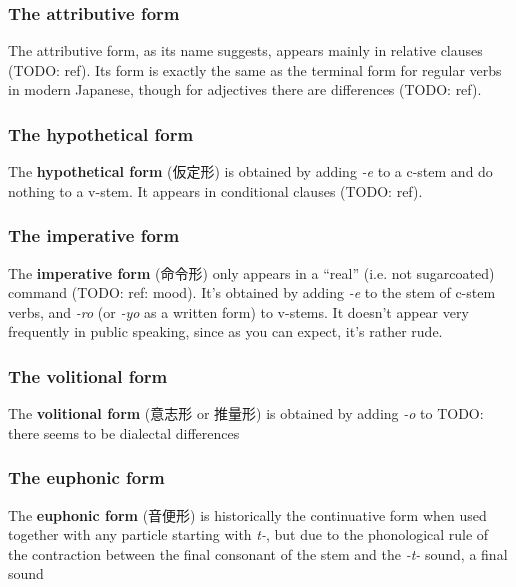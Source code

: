 \documentclass[UTF8, a4paper, oneside, scheme=plain]{ctexrep}
\newcommand*{\concept}[1]{\textbf{#1}}
\newcommand{\corpus}[1]{\emph{#1}}
\begin{document}
\subsubsection{The attributive form}

The attributive form, as its name suggests, appears mainly in relative clauses (TODO: ref).
Its form is exactly the same as the terminal form for regular verbs in modern Japanese,
though for adjectives there are differences (TODO: ref).

\subsubsection{The hypothetical form}

The \concept{hypothetical form} (仮定形) is obtained by adding \corpus{-e} to a c-stem and do nothing to a v-stem.
It appears in conditional clauses (TODO: ref).

\subsubsection{The imperative form}\label{sec:imperative-form}

The \concept{imperative form} (命令形) only appears in a ``real'' (i.e. not sugarcoated) command (TODO: ref: mood).
It's obtained by adding \corpus{-e} to the stem of c-stem verbs,
and \corpus{-ro} (or \corpus{-yo} as a written form) to v-stems.
It doesn't appear very frequently in public speaking, 
since as you can expect, 
it's rather rude.

\subsubsection{The volitional form}\label{sec:volition-form}

The \concept{volitional form} (意志形 or 推量形)
is obtained by adding \corpus{-o} to TODO: there seems to be dialectal differences

\subsubsection{The euphonic form}\label{sec:euphonic-form}

The \concept{euphonic form} (音便形) is 
historically the continuative form when used together with any particle starting with \corpus{t-},
but due to the phonological rule of the contraction 
between the final consonant of the stem and the \corpus{-t-} sound,
a final sound 
\end{document}
